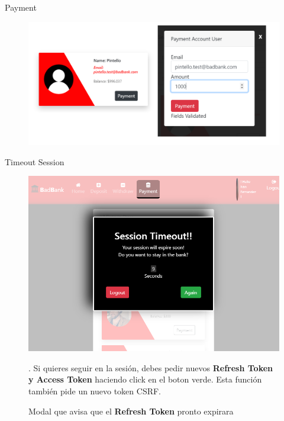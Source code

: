\documentclass[xcolor=pdftex,dvipsnames,table]{beamer}
\begin{document}
\begin{frame}{Payment}
    \begin{figure}[htb]
        \centering
        \captionsetup{justification=centering,margin=0.3cm}
        \includegraphics[width=0.9\linewidth]{extras/payemn1.png}
    \end{figure} 
\end{frame}
\begin{frame}{Timeout Session}
    \begin{figure}[htb]
        \centering
        \captionsetup{justification=centering,margin=0.3cm}
        \includegraphics[width=0.9\linewidth]{extras/timessesion.png}
        \caption*{\footnotesize Modal que avisa que  el \textbf{Refresh Token} pronto expirara }. Si quieres seguir en la sesión, debes pedir nuevos \textbf{Refresh Token y Access Token} haciendo click en el boton verde. Esta función también pide un nuevo token CSRF. 
    \end{figure} 
\end{frame}
\end{document}
